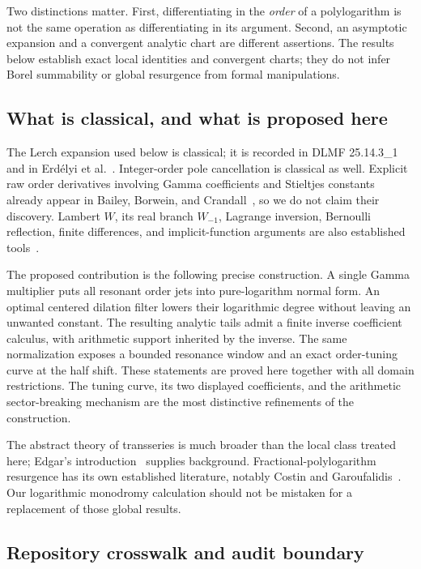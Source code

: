 \documentclass[11pt,a4paper]{article}
\numberwithin{equation}{section}
\theoremstyle{definition}\newtheorem{definition}[theorem]{Definition}
\theoremstyle{remark}\newtheorem{remark}[theorem]{Remark}
\begin{document}
Two distinctions matter. First, differentiating in the \emph{order} of a polylogarithm is not the same operation as differentiating in its argument. Second, an asymptotic expansion and a convergent analytic chart are different assertions. The results below establish exact local identities and convergent charts; they do not infer Borel summability or global resurgence from formal manipulations.

\subsection{What is classical, and what is proposed here}

The Lerch expansion used below is classical; it is recorded in DLMF 25.14.3\_1 and in Erd\'elyi et al.~\cite{dlmflerch,erdelyi}. Integer-order pole cancellation is classical as well. Explicit raw order derivatives involving Gamma coefficients and Stieltjes constants already appear in Bailey, Borwein, and Crandall~\cite{bbc}, so we do not claim their discovery. Lambert $W$, its real branch $W_{-1}$, Lagrange inversion, Bernoulli reflection, finite differences, and implicit-function arguments are also established tools~\cite{dlmfw,corless,dlmfcomplex,dlmfhurwitz}.

The proposed contribution is the following precise construction. A single Gamma multiplier puts all resonant order jets into pure-logarithm normal form. An optimal centered dilation filter lowers their logarithmic degree without leaving an unwanted constant. The resulting analytic tails admit a finite inverse coefficient calculus, with arithmetic support inherited by the inverse. The same normalization exposes a bounded resonance window and an exact order-tuning curve at the half shift. These statements are proved here together with all domain restrictions. The tuning curve, its two displayed coefficients, and the arithmetic sector-breaking mechanism are the most distinctive refinements of the construction.

The abstract theory of transseries is much broader than the local class treated here; Edgar's introduction~\cite{edgar} supplies background. Fractional-polylogarithm resurgence has its own established literature, notably Costin and Garoufalidis~\cite{costingaroufalidis}. Our logarithmic monodromy calculation should not be mistaken for a replacement of those global results.

\subsection{Repository crosswalk and audit boundary}
\end{document}
